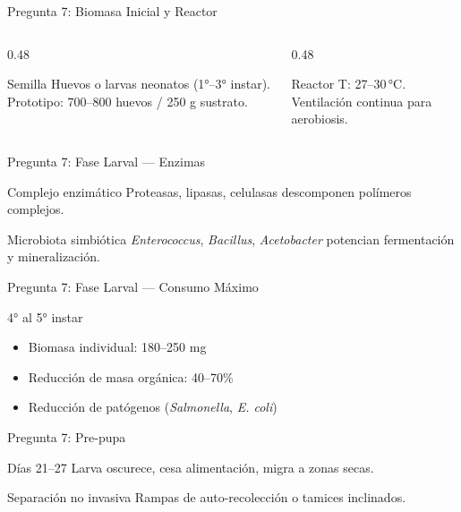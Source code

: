 \documentclass[aspectratio=169, 11pt]{beamer}
\begin{document}
\begin{frame}{Pregunta 7: Biomasa Inicial y Reactor}
\begin{columns}[T]
\begin{column}{0.48\textwidth}
\begin{block}{Semilla}
\footnotesize
Huevos o larvas neonatos (1°--3° instar). Prototipo: 700--800 huevos / 250 g sustrato.
\end{block}
\end{column}
\begin{column}{0.48\textwidth}
\begin{block}{Reactor}
\footnotesize
T: 27--30\,°C. Ventilación continua para aerobiosis.
\end{block}
\end{column}
\end{columns}
\end{frame}

\begin{frame}{Pregunta 7: Fase Larval --- Enzimas}
\begin{block}{Complejo enzimático}
\footnotesize
Proteasas, lipasas, celulasas descomponen polímeros complejos.
\end{block}
\begin{exampleblock}{Microbiota simbiótica}
\footnotesize
\textit{Enterococcus}, \textit{Bacillus}, \textit{Acetobacter} potencian fermentación y mineralización.
\end{exampleblock}
\end{frame}

\begin{frame}{Pregunta 7: Fase Larval --- Consumo Máximo}
\begin{alertblock}{4° al 5° instar}
\footnotesize
\begin{itemize}
    \item Biomasa individual: 180--250 mg
    \item Reducción de masa orgánica: 40--70\%
    \item Reducción de patógenos (\textit{Salmonella}, \textit{E. coli})
\end{itemize}
\end{alertblock}
\end{frame}

\begin{frame}{Pregunta 7: Pre-pupa}
\begin{block}{Días 21--27}
\footnotesize
Larva oscurece, cesa alimentación, migra a zonas secas.
\end{block}
\begin{exampleblock}{Separación no invasiva}
\footnotesize
Rampas de auto-recolección o tamices inclinados.
\end{exampleblock}
\end{frame}
\end{document}
